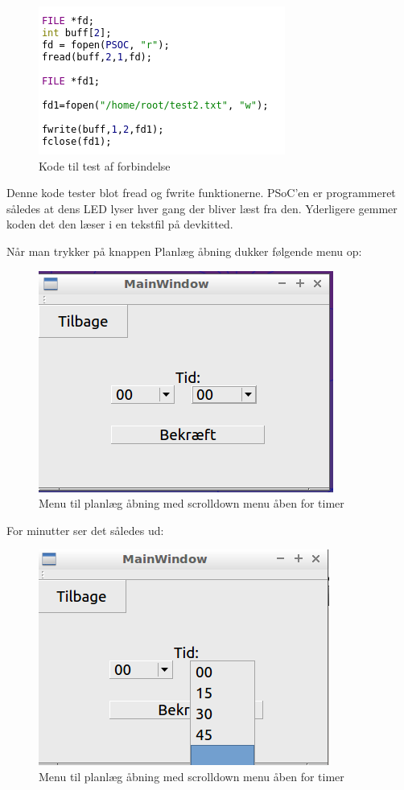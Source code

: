 \begin{figure}[H]
	\centering
\includegraphics{Billeder/testKode}
\caption{Kode til test af forbindelse}
\end{figure}

Denne kode tester blot fread og fwrite funktionerne. PSoC'en er programmeret således at dens LED lyser hver gang der bliver læst fra den. Yderligere gemmer koden det den læser i en tekstfil på devkitted.

Når man trykker på knappen Planlæg åbning dukker følgende menu op:

\begin{figure}[H]
	\centering
\includegraphics{Billeder/paMin}
\caption{Menu til planlæg åbning med scrolldown menu åben for timer}
\end{figure}

For minutter ser det således ud:

\begin{figure}[H]
	\centering
\includegraphics{Billeder/paMinutter}
\caption{Menu til planlæg åbning med scrolldown menu åben for timer}
\end{figure}
